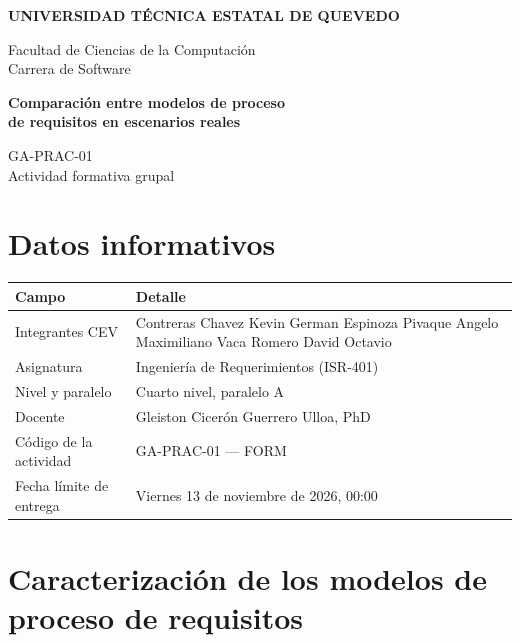 \documentclass[11pt,a4paper]{article}
\begin{document}
\begin{center}
    {\large\textbf{UNIVERSIDAD TÉCNICA ESTATAL DE QUEVEDO}}\par

    Facultad de Ciencias de la Computación\\
    Carrera de Software\par

    \vspace{0.6cm}

    {\LARGE\bfseries
        Comparación entre modelos de proceso\\
        de requisitos en escenarios reales\par
    }

    \vspace{0.2cm}

    {\large GA-PRAC-01}\\
    Actividad formativa grupal
\end{center}

\vspace{0.4cm}

\section{Datos informativos}

\begin{tabularx}{\textwidth}{|l|X|}
    \hline
    \rowcolor{gray!15}
    \textbf{Campo} & \textbf{Detalle} \\ \hline
    Integrantes \textperiodcentered{} CEV &
    Contreras Chavez Kevin German\newline
    Espinoza Pivaque Angelo Maximiliano\newline
    Vaca Romero David Octavio \\ \hline
    Asignatura & Ingeniería de Requerimientos (ISR-401) \\ \hline
    Nivel y paralelo & Cuarto nivel, paralelo A \\ \hline
    Docente & Gleiston Cicerón Guerrero Ulloa, PhD \\ \hline
    Código de la actividad & GA-PRAC-01 --- FORM \\ \hline
    Fecha límite de entrega & Viernes 13 de noviembre de 2026, 00:00 \\ \hline
\end{tabularx}

\section{Caracterización de los modelos de proceso de requisitos}
\end{document}

